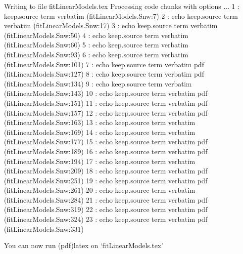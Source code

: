 \documentclass{report}
\begin{document}
\begin{Schunk}
\begin{Soutput}
Writing to file fitLinearModels.tex
Processing code chunks with options ...
 1 : keep.source term verbatim (fitLinearModels.Snw:7)
 2 : echo keep.source term verbatim (fitLinearModels.Snw:17)
 3 : echo keep.source term verbatim (fitLinearModels.Snw:50)
 4 : echo keep.source term verbatim (fitLinearModels.Snw:60)
 5 : echo keep.source term verbatim (fitLinearModels.Snw:93)
 6 : echo keep.source term verbatim (fitLinearModels.Snw:101)
 7 : echo keep.source term verbatim pdf  (fitLinearModels.Snw:127)
 8 : echo keep.source term verbatim pdf  (fitLinearModels.Snw:134)
 9 : echo keep.source term verbatim (fitLinearModels.Snw:143)
10 : echo keep.source term verbatim pdf  (fitLinearModels.Snw:151)
11 : echo keep.source term verbatim pdf  (fitLinearModels.Snw:157)
12 : echo keep.source term verbatim pdf  (fitLinearModels.Snw:163)
13 : echo keep.source term verbatim (fitLinearModels.Snw:169)
14 : echo keep.source term verbatim (fitLinearModels.Snw:177)
15 : echo keep.source term verbatim pdf  (fitLinearModels.Snw:189)
16 : echo keep.source term verbatim pdf  (fitLinearModels.Snw:194)
17 : echo keep.source term verbatim (fitLinearModels.Snw:209)
18 : echo keep.source term verbatim pdf  (fitLinearModels.Snw:251)
19 : echo keep.source term verbatim pdf  (fitLinearModels.Snw:261)
20 : echo keep.source term verbatim (fitLinearModels.Snw:284)
21 : echo keep.source term verbatim pdf  (fitLinearModels.Snw:319)
22 : echo keep.source term verbatim pdf  (fitLinearModels.Snw:324)
23 : echo keep.source term verbatim pdf  (fitLinearModels.Snw:331)

You can now run (pdf)latex on ‘fitLinearModels.tex’
\end{Soutput}
\end{Schunk}
\end{document}
